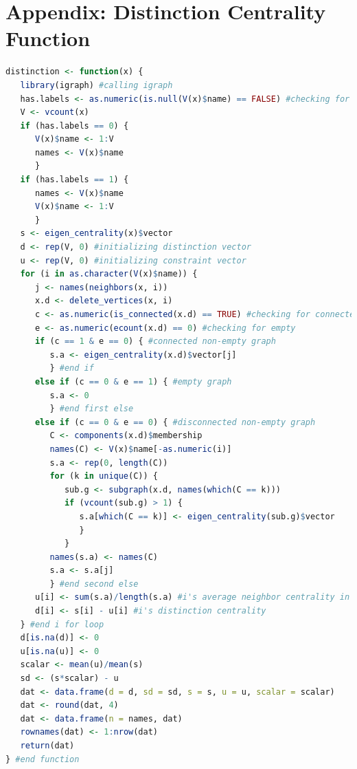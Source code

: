 \documentclass[12pt]{article}
\begin{document}
\section*{Appendix: Distinction
Centrality Function} \label{sec:appendix}
\begin{lstlisting}[language=R]
distinction <- function(x) { 
   library(igraph) #calling igraph
   has.labels <- as.numeric(is.null(V(x)$name) == FALSE) #checking for vertex labels
   V <- vcount(x)
   if (has.labels == 0) {
      V(x)$name <- 1:V
      names <- V(x)$name 
      }
   if (has.labels == 1) {
      names <- V(x)$name 
      V(x)$name <- 1:V
      }
   s <- eigen_centrality(x)$vector
   d <- rep(V, 0) #initializing distinction vector
   u <- rep(V, 0) #initializing constraint vector
   for (i in as.character(V(x)$name)) {
      j <- names(neighbors(x, i))
      x.d <- delete_vertices(x, i)
      c <- as.numeric(is_connected(x.d) == TRUE) #checking for connectedness
      e <- as.numeric(ecount(x.d) == 0) #checking for empty
      if (c == 1 & e == 0) { #connected non-empty graph
         s.a <- eigen_centrality(x.d)$vector[j]
         } #end if
      else if (c == 0 & e == 1) { #empty graph
         s.a <- 0
         } #end first else 
      else if (c == 0 & e == 0) { #disconnected non-empty graph
         C <- components(x.d)$membership
         names(C) <- V(x)$name[-as.numeric(i)]
         s.a <- rep(0, length(C))
         for (k in unique(C)) {
            sub.g <- subgraph(x.d, names(which(C == k)))
            if (vcount(sub.g) > 1) {
               s.a[which(C == k)] <- eigen_centrality(sub.g)$vector
               }
            }
         names(s.a) <- names(C)
         s.a <- s.a[j]
         } #end second else
      u[i] <- sum(s.a)/length(s.a) #i's average neighbor centrality in node deleted subgraph
      d[i] <- s[i] - u[i] #i's distinction centrality
   } #end i for loop
   d[is.na(d)] <- 0
   u[is.na(u)] <- 0
   scalar <- mean(u)/mean(s)
   sd <- (s*scalar) - u
   dat <- data.frame(d = d, sd = sd, s = s, u = u, scalar = scalar)
   dat <- round(dat, 4)
   dat <- data.frame(n = names, dat)
   rownames(dat) <- 1:nrow(dat)
   return(dat)
} #end function
\end{lstlisting}
\end{document}
